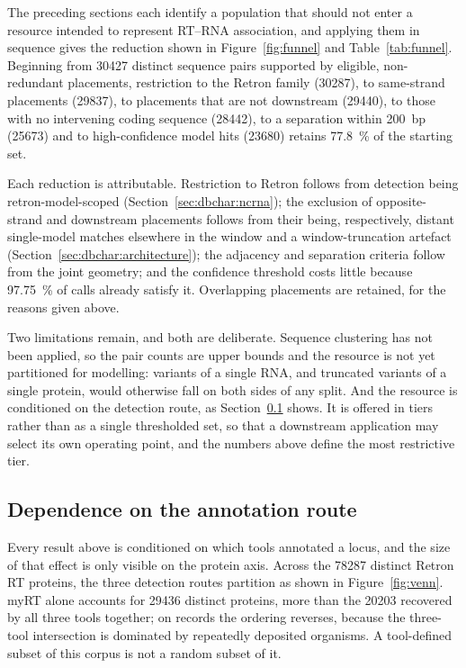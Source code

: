 The preceding sections each identify a population that should not enter a resource intended to
represent RT--RNA association, and applying them in sequence gives the reduction shown in
Figure~\ref{fig:funnel} and Table~\ref{tab:funnel}. Beginning from \num{30427} distinct sequence
pairs supported by eligible, non-redundant placements, restriction to the Retron family
(\num{30287}), to same-strand placements (\num{29837}), to placements that are not downstream
(\num{29440}), to those with no intervening coding sequence (\num{28442}), to a separation within
200~bp (\num{25673}) and to high-confidence model hits (\num{23680}) retains \SI{77.8}{\percent} of
the starting set.

Each reduction is attributable. Restriction to Retron follows from detection being
retron-model-scoped (Section~\ref{sec:dbchar:ncrna}); the exclusion of opposite-strand and
downstream placements follows from their being, respectively, distant single-model matches elsewhere
in the window and a window-truncation artefact (Section~\ref{sec:dbchar:architecture}); the
adjacency and separation criteria follow from the joint geometry; and the confidence threshold costs
little because \SI{97.75}{\percent} of calls already satisfy it. Overlapping placements are retained,
for the reasons given above.

Two limitations remain, and both are deliberate. Sequence clustering has not been applied, so the
pair counts are upper bounds and the resource is not yet partitioned for modelling: variants of a
single RNA, and truncated variants of a single protein, would otherwise fall on both sides of any
split. And the resource is conditioned on the detection route, as Section~\ref{sec:dbchar:tools}
shows. It is offered in tiers rather than as a single thresholded set, so that a downstream
application may select its own operating point, and the numbers above define the most restrictive
tier.

\subsection{Dependence on the annotation route}
\label{sec:dbchar:tools}

Every result above is conditioned on which tools annotated a locus, and the size of that effect is
only visible on the protein axis. Across the \num{78287} distinct Retron RT proteins, the three
detection routes partition as shown in Figure~\ref{fig:venn}. myRT alone accounts for \num{29436}
distinct proteins, more than the \num{20203} recovered by all three tools together; on records the
ordering reverses, because the three-tool intersection is dominated by repeatedly deposited
organisms. A tool-defined subset of this corpus is not a random subset of it.

